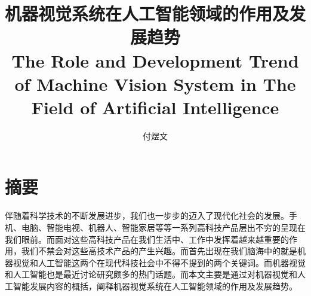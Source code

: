 \confidential{}%
\title{机器视觉系统在人工智能领域的作用及发展趋势\\The Role and Development Trend\\ of Machine Vision System in The Field of Artificial Intelligence}%
\author{付煜文}%
\advisorsec{}%
\maketitle%
\makeenglishtitle%
\makedeclaration%
\chapter[摘要]{摘\quad 要}%
\setcounter{page}{1}%
伴随着科学技术的不断发展进步，我们也一步步的迈入了现代化社会的发展。手机、电脑、智能电视、机器人、智能家居等等一系列高科技产品层出不穷的呈现在我们眼前。而面对这些高科技产品在我们生活中、工作中发挥着越来越重要的作用，我们不禁会对这些高技术产品的产生兴趣。而首先出现在我们脑海中的就是机器视觉和人工智能这两个在现代科技社会中不得不提到的两个关键词。而机器视觉和人工智能也是最近讨论研究颇多的热门话题。而本文主要是通过对机器视觉和人工智能发展内容的概括，阐释机器视觉系统在人工智能领域的作用及发展趋势。




